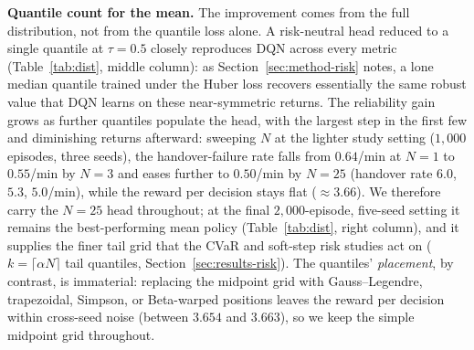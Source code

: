 \documentclass[conference]{IEEEtran}
\begin{document}
\textbf{Quantile count for the mean.}
The improvement comes from the full
distribution, not from the quantile loss alone. A risk-neutral head reduced to a
single quantile at $\tau=0.5$ closely reproduces DQN across every metric
(Table~\ref{tab:dist}, middle column): as Section~\ref{sec:method-risk} notes, a
lone median quantile trained under the Huber loss recovers essentially the same
robust value that DQN learns on these near-symmetric returns. The reliability gain
grows as further quantiles populate the head, with the largest step in the first
few and diminishing returns afterward: sweeping $N$ at the lighter study setting
($1{,}000$ episodes, three seeds), the
handover-failure rate falls from $0.64$/min at $N{=}1$ to $0.55$/min by $N{=}3$ and
eases further to $0.50$/min by $N{=}25$ (handover rate $6.0$, $5.3$, $5.0$/min),
while the reward per decision stays flat (${\approx}3.66$). We therefore carry the
$N{=}25$ head throughout; at the final $2{,}000$-episode, five-seed setting it
remains the best-performing mean policy (Table~\ref{tab:dist}, right column), and
it supplies the finer tail grid that the CVaR and
soft-step risk studies act on ($k=\lceil\alpha N\rceil$ tail quantiles,
Section~\ref{sec:results-risk}). The quantiles'
\emph{placement}, by contrast, is immaterial:
replacing the midpoint grid with Gauss--Legendre, trapezoidal, Simpson, or
Beta-warped positions leaves the reward per decision within cross-seed noise
(between $3.654$ and $3.663$), so we keep the simple midpoint grid throughout.
\end{document}
